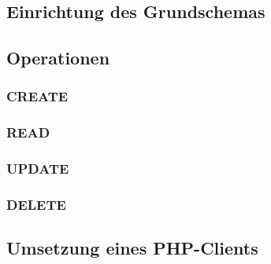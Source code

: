 
\subsection{Einrichtung des Grundschemas}
\subsection{Operationen}
\subsubsection{CREATE}
\subsubsection{READ}
\subsubsection{UPDATE}
\subsubsection{DELETE}
\subsection{Umsetzung eines PHP-Clients}
